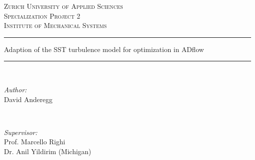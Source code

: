 \begin{titlepage}

    \newcommand{\HRule}{\rule{\linewidth}{0.5mm}} 

    \center %


    \textsc{\LARGE Zurich University of Applied Sciences}\\[1.5cm] 
    \textsc{\Large Specialization Project 2}\\[0.5cm] 
    \textsc{\large Institute of Mechanical Systems}\\[0.5cm] 


    \HRule 
    { \huge \bfseries
    \begin{spacing}{1.2}
        Adaption of the SST turbulence model for optimization in ADflow
    \end{spacing}}
    \HRule \\[0.5cm]


    \begin{minipage}{0.4\textwidth}
        \begin{flushleft} \large
            \emph{Author:}\\
            David Anderegg\\
        \end{flushleft}
    \end{minipage}
    ~
    \begin{minipage}{0.4\textwidth}
        \begin{flushright} \large
            \emph{Supervisor:} \\
            Prof. Marcello Righi \\
            Dr. Anil Yildirim (Michigan)
        \end{flushright}
    \end{minipage}\\[1.5cm]


\end{titlepage}
